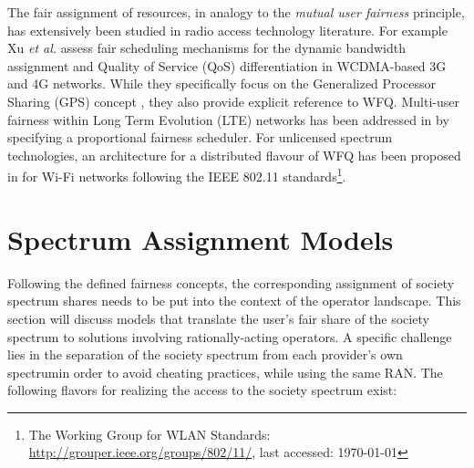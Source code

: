 \documentclass[conference]{IEEEtran}
\begin{document}
The fair assignment of resources, in analogy to the \textit{mutual user fairness} principle, has extensively been studied in radio access technology literature. For example Xu \textit{et al.} \cite{xu2002dynamic} assess fair scheduling mechanisms for the dynamic bandwidth assignment and Quality of Service (QoS) differentiation in WCDMA-based 3G and 4G networks. While they specifically focus on the Generalized Processor Sharing (GPS) concept \cite{parekh1993generalized}, they also provide explicit reference to WFQ.  Multi-user fairness within Long Term Evolution (LTE) networks has been addressed in \cite{kwan2009proportional} by  specifying a proportional fairness scheduler. For unlicensed spectrum technologies, an architecture for a distributed flavour of WFQ has  been proposed in \cite{banchs2002distributed} for Wi-Fi networks following the IEEE 802.11 standards\footnote{The Working Group for WLAN Standards: \url{http://grouper.ieee.org/groups/802/11/}, last accessed: \today}.  














\section{Spectrum Assignment Models} \label{sec:spectrum_access}




Following the defined fairness concepts, the corresponding assignment of society spectrum shares needs to be put into the context of the operator landscape. This section will discuss models that translate the user's fair share of the society spectrum to solutions involving rationally-acting operators. A specific challenge lies in the separation of the society spectrum from each provider's own spectrumin order to avoid cheating practices, while using the same RAN. The following flavors for realizing the access to the society spectrum exist:
\end{document}
